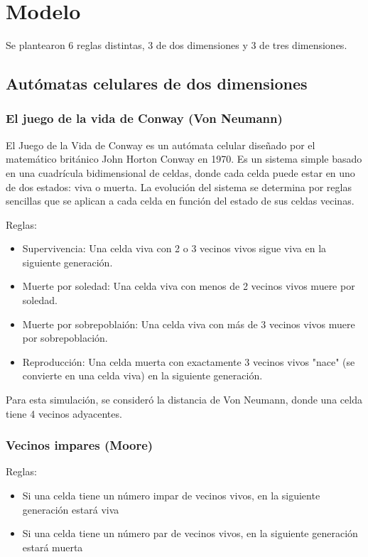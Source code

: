 \section{Modelo}
\label{sec:modelo}
Se plantearon 6 reglas distintas, 3 de dos dimensiones y 3 de tres  dimensiones.

\subsection{Autómatas celulares de dos dimensiones}
\label{subsec:2d}

\subsubsection{El juego de la vida de Conway (Von Neumann)}

El Juego de la Vida de Conway \cite{GameOfLifeGardner} es un autómata celular diseñado por el matemático británico John Horton Conway en 1970.
Es un sistema simple basado en una cuadrícula bidimensional de celdas, donde cada celda puede estar en uno de dos estados: viva o muerta.
La evolución del sistema se determina por reglas sencillas que se aplican a cada celda en función del estado de sus celdas vecinas.

Reglas:
\begin{itemize}
    \item Supervivencia: Una celda viva con 2 o 3 vecinos vivos sigue viva en la siguiente generación.

    \item Muerte por soledad: Una celda viva con menos de 2 vecinos vivos muere por soledad.

    \item Muerte por sobrepoblaión: Una celda viva con más de 3 vecinos vivos muere por sobrepoblación.

    \item Reproducción: Una celda muerta con exactamente 3 vecinos vivos "nace" (se convierte en una celda viva) en la siguiente generación.
\end{itemize}

Para esta simulación, se consideró la distancia de Von Neumann, donde una celda tiene 4 vecinos adyacentes.

\subsubsection{Vecinos impares (Moore)}

Reglas:
\begin{itemize}
    \item Si una celda tiene un número impar de vecinos vivos, en la siguiente generación estará viva
    \item Si una celda tiene un número par de vecinos vivos, en la siguiente generación estará muerta
\end{itemize}


